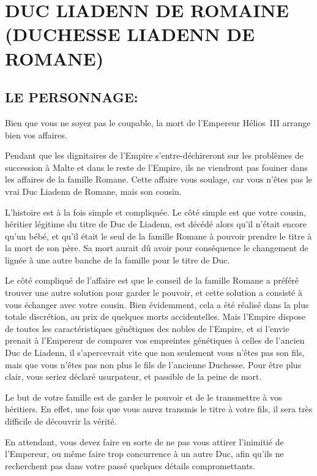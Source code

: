 \documentclass[14pt,twocolumn]{extarticle}
\begin{document}
\section{DUC LIADENN DE ROMAINE\\(DUCHESSE LIADENN DE ROMANE)}

\subsection{LE PERSONNAGE:}

Bien que vous ne soyez pas le coupable, la mort de l'Empereur Hélios~III
arrange bien vos affaires.

Pendant que les dignitaires de l'Empire s'entre-déchireront sur les problèmes
de succession à Malte et dans le reste de l'Empire, ils ne viendront pas
fouiner dans les affaires de la famille Romane. Cette affaire vous soulage, car
vous n'êtes pas le vrai Duc Liadenn de Romane, mais son cousin.

L'histoire est à la fois simple et compliquée. Le côté simple est que votre
cousin, héritier légitime du titre de Duc de Liadenn, est décédé alors qu'il
n'était encore qu'un bébé, et qu'il était le seul de la famille Romane à
pouvoir prendre le titre à la mort de son père. Sa mort aurait dû avoir pour
conséquence le changement de lignée à une autre banche de la famille pour le
titre de Duc.

Le côté compliqué de l'affaire est que le conseil de la famille Romane a
préféré trouver une autre solution pour garder le pouvoir, et cette solution a
consisté à vous \og échanger\fg{} avec votre cousin. Bien évidemment, cela a
été réalisé dans la plus totale discrétion, au prix de quelques morts
\og accidentelles\fg{}. Mais l'Empire dispose de toutes les caractéristiques
génétiques des nobles de l'Empire, et si l'envie prenait à l'Empereur de
comparer vos empreintes génétiques à celles de l'ancien Duc de Liadenn, il
s'apercevrait vite que non seulement vous n'êtes pas son fils, mais que vous
n'êtes pas non plus le fils de l'ancienne Duchesse. Pour être plus clair, vous
seriez déclaré usurpateur, et passible de la peine de mort.

Le but de votre famille est de garder le pouvoir et de le transmettre à vos
héritiers. En effet, une fois que vous aurez transmis le titre à votre fils, il
sera très difficile de découvrir la vérité.

En attendant, vous devez faire en sorte de ne pas vous attirer l'inimitié de
l'Empereur, ou même faire trop concurrence à un autre Duc, afin qu'ils ne
recherchent pas dans votre passé quelques détails compromettants.
\end{document}

